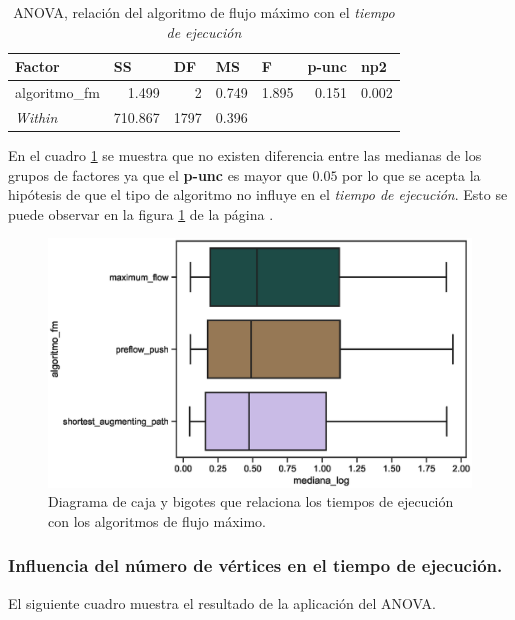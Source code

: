 \documentclass{article}
\begin{document}
\begin{table}[htbp]
  \centering
  \caption{ANOVA, relación del algoritmo de flujo máximo con el \textit{tiempo de ejecución}}
    \begin{tabular}{lrrrlll}
    \toprule
    \textbf{Factor} & \multicolumn{1}{l}{\textbf{SS}} & \multicolumn{1}{l}{\textbf{DF}} & \multicolumn{1}{l}{\textbf{MS}} & \textbf{F} & \textbf{p-unc} & \textbf{np2} \\
    \midrule
    algoritmo\_fm & 1.499 & 2     & 0.749 & \multicolumn{1}{r}{1.895} & \multicolumn{1}{r}{0.151} & \multicolumn{1}{r}{0.002} \\
    \textit{Within} & 710.867 & 1797  & 0.396 &      &      &  \\
    \bottomrule
    \end{tabular}%
  \label{tab:t3}%
\end{table}%
En el cuadro \ref{tab:t3} se muestra que no existen diferencia entre las medianas de los grupos de factores ya que el \textbf{p-unc} es mayor que $0.05$ por lo que se acepta la hipótesis de que el tipo de algoritmo no influye en el \textit{tiempo de ejecución}. Esto se puede observar en la figura \ref{fig5} de la página \pageref{fig5}. 
\begin{center}
\begin{figure}[htbp]
\includegraphics[scale=0.6]{boxplotalgoritmofm.eps}
\caption{Diagrama de caja y bigotes que relaciona los tiempos de ejecución con los algoritmos de flujo máximo.}
\label{fig5}
\end{figure}
\end{center}
\newpage

\subsubsection{Influencia del número de vértices en el tiempo de ejecución.}
El siguiente cuadro muestra el resultado de la aplicación del ANOVA.
\end{document}
